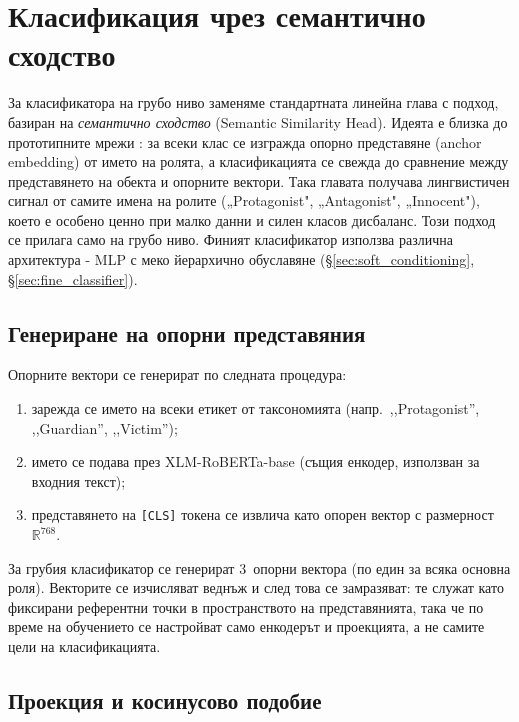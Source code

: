 \documentclass[12pt,a4paper]{report}
\begin{document}
\section{Класификация чрез семантично сходство}
\label{sec:semantic_head}

За класификатора на грубо ниво заменяме стандартната линейна глава с подход, базиран на \textit{семантично сходство} (Semantic Similarity Head). Идеята е близка до прототипните мрежи \cite{snell2017prototypical}: за всеки клас се изгражда опорно представяне (anchor embedding) от името на ролята, а класификацията се свежда до сравнение между представянето на обекта и опорните вектори. Така главата получава лингвистичен сигнал от самите имена на ролите („Protagonist", „Antagonist", „Innocent"), което е особено ценно при малко данни и силен класов дисбаланс. Този подход се прилага само на грубо ниво. Финият класификатор използва различна архитектура - MLP с меко йерархично обуславяне (§\ref{sec:soft_conditioning}, §\ref{sec:fine_classifier}).

\subsection{Генериране на опорни представяния}

Опорните вектори се генерират по следната процедура:
\begin{enumerate}
  \item зарежда се името на всеки етикет от таксономията (напр.\ ,,Protagonist'', ,,Guardian'', ,,Victim'');
  \item името се подава през XLM-RoBERTa-base (същия енкодер, използван за входния текст);
  \item представянето на \texttt{[CLS]} токена се извлича като опорен вектор с размерност $\mathbb{R}^{768}$.
\end{enumerate}

За грубия класификатор се генерират 3~опорни вектора (по един за всяка основна роля). Векторите се изчисляват веднъж и след това се замразяват: те служат като фиксирани референтни точки в пространството на представянията, така че по време на обучението се настройват само енкодерът и проекцията, а не самите цели на класификацията.

\subsection{Проекция и косинусово подобие}
\end{document}
